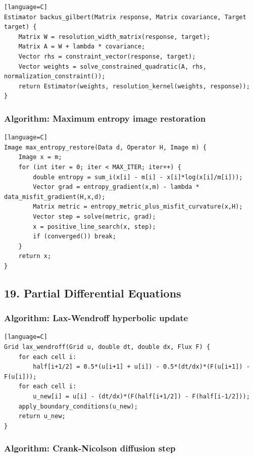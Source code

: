 \documentclass[11pt]{article}
\begin{document}
\begin{verbatim}[language=C]
Estimator backus_gilbert(Matrix response, Matrix covariance, Target target) {
    Matrix W = resolution_width_matrix(response, target);
    Matrix A = W + lambda * covariance;
    Vector rhs = constraint_vector(response, target);
    Vector weights = solve_constrained_quadratic(A, rhs, normalization_constraint());
    return Estimator(weights, resolution_kernel(weights, response));
}
\end{verbatim}

\subsubsection{Algorithm: Maximum entropy image restoration}\label{algorithm-maximum-entropy-image-restoration}

\begin{verbatim}[language=C]
Image max_entropy_restore(Data d, Operator H, Image m) {
    Image x = m;
    for (int iter = 0; iter < MAX_ITER; iter++) {
        double entropy = sum_i(x[i] - m[i] - x[i]*log(x[i]/m[i]));
        Vector grad = entropy_gradient(x,m) - lambda * data_misfit_gradient(H,x,d);
        Matrix metric = entropy_metric_plus_misfit_curvature(x,H);
        Vector step = solve(metric, grad);
        x = positive_line_search(x, step);
        if (converged()) break;
    }
    return x;
}
\end{verbatim}

\subsection{19. Partial Differential Equations}\label{partial-differential-equations}

\subsubsection{Algorithm: Lax-Wendroff hyperbolic update}\label{algorithm-lax-wendroff-hyperbolic-update}

\begin{verbatim}[language=C]
Grid lax_wendroff(Grid u, double dt, double dx, Flux F) {
    for each cell i:
        half[i+1/2] = 0.5*(u[i+1] + u[i]) - 0.5*(dt/dx)*(F(u[i+1]) - F(u[i]));
    for each cell i:
        u_new[i] = u[i] - (dt/dx)*(F(half[i+1/2]) - F(half[i-1/2]));
    apply_boundary_conditions(u_new);
    return u_new;
}
\end{verbatim}

\subsubsection{Algorithm: Crank-Nicolson diffusion step}\label{algorithm-crank-nicolson-diffusion-step}
\end{document}
